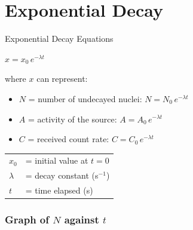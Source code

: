 \section{Exponential Decay}

\begin{formulabox}{Exponential Decay Equations}
\begin{center}
\Large $x = x_0\,e^{-\lambda t}$
\end{center}
\vspace{0.3em}
where $x$ can represent:
\begin{itemize}[itemsep=2pt]
  \item $N$ = number of undecayed nuclei: \quad $N = N_0\,e^{-\lambda t}$
  \item $A$ = activity of the source: \quad $A = A_0\,e^{-\lambda t}$
  \item $C$ = received count rate: \quad $C = C_0\,e^{-\lambda t}$
\end{itemize}
\vspace{0.4em}
\begin{tabular}{@{}ll@{}}
$x_0$ & = initial value at $t = 0$ \\
$\lambda$ & = decay constant (s$^{-1}$) \\
$t$ & = time elapsed (s) \\
\end{tabular}
\end{formulabox}

\subsubsection*{Graph of $N$ against $t$}


